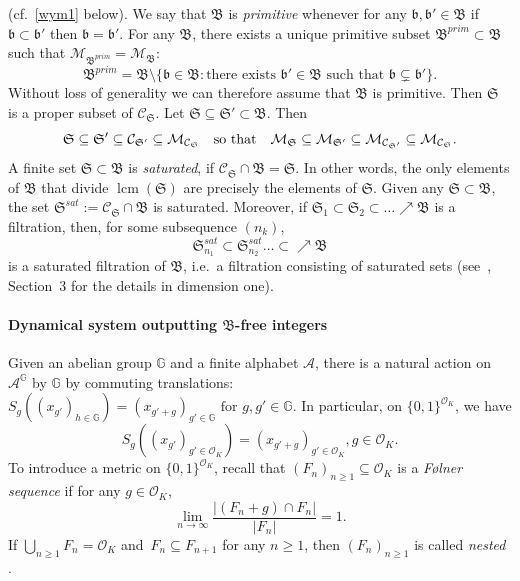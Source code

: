 \documentclass[leqno,a4paper,12pt]{article}
\DeclareMathOperator{\lcm}{lcm}
\theoremstyle{definition}
\newcommand{\cM}{{\cal M}}
\newcommand{\OK}{\mathcal{O}_K}
\newcommand{\cC}{\mathcal{C}}
\begin{document}
(cf.~\eqref{wym1} below).
We say that $\mathfrak{B}$ is \emph{primitive} whenever for any $\mathfrak{b},\mathfrak{b}'\in\mathfrak{B}$ if $\mathfrak{b}\subset\mathfrak{b}'$ then $\mathfrak{b}=\mathfrak{b}'$. For any $\mathfrak{B}$, there exists a unique primitive subset $\mathfrak{B}^{prim}\subset\mathfrak{B}$ such that $\mathcal{M}_{\mathfrak{B}^{prim}}=\mathcal{M}_{\mathfrak{B}}$:
\[
\mathfrak{B}^{prim}=\mathfrak{B}\setminus\{\mathfrak{b}\in\mathfrak{B} : \text{there exists }\mathfrak{b}'\in\mathfrak{B}\text{ such that }\mathfrak{b}\subsetneq\mathfrak{b}'\}.
\]
Without loss of generality we can therefore assume that $\mathfrak{B}$ is primitive. Then $\mathfrak{S}$ is a proper subset of $\cC_\mathfrak{S}$.
Let $\mathfrak{S}\subseteq \mathfrak{S}' \subset\mathfrak{B}$. Then
\begin{equation*}\label{eq:A_S-inclusions}
\mathfrak{S}\subseteq\mathfrak{S}'\subseteq\cC_{\mathfrak{S}'}\subseteq\cM_{\cC_\mathfrak{S}}\text{\quad so that\quad}
\cM_\mathfrak{S}\subseteq\cM_{\mathfrak{S}'}\subseteq\cM_{\cC_{\mathfrak{S}'}}\subseteq\cM_{\cC_\mathfrak{S}}.
\end{equation*}
A finite set $\mathfrak{S}\subset\mathfrak{B}$ is \emph{saturated}, if $\cC_\mathfrak{S}\cap\mathfrak{B}=\mathfrak{S}$. In other words, the only elements of $\mathfrak{B}$ that divide $\lcm(\mathfrak{S})$ are precisely the elements of $\mathfrak{S}$.
 Given any $\mathfrak{S}\subset \mathfrak{B}$, the set $\mathfrak{S}^{sat}:=\cC_\mathfrak{S}\cap\mathfrak{B}$ is saturated. Moreover, if $\mathfrak{S}_1\subset \mathfrak{S}_2\subset\dots \nearrow \mathfrak{B}$ is a filtration, then, for some subsequence $(n_k)$,
\[
\mathfrak{S}_{n_1}^{sat}\subset \mathfrak{S}_{n_2}^{sat} \dots\subset\nearrow \mathfrak{B}
\]
is a saturated filtration of $\mathfrak{B}$, i.e.\ a filtration consisting of saturated sets (see~\cite{DKK}, Section~3 for the details in dimension one).

\paragraph{Dynamical system outputting $\mathfrak{B}$-free integers}\label{szift}
Given an abelian group $\mathbb{G}$ and a finite alphabet $\mathcal{A}$, there is a natural action on $\mathcal{A}^\mathbb{G}$ by $\mathbb{G}$ by commuting translations: $S_g({(x_{g'})}_{h\in \mathbb{G}})={(x_{g'+g})}_{g'\in \mathbb{G}}\text{ for }g,g'\in \mathbb{G}.$
In particular, on $\{0,1\}^{\OK}$, we have
\begin{equation*}\label{eq:translations}
S_g({(x_{g'})}_{g'\in \mathcal{O}_K})={(x_{g'+g})}_{g'\in \mathcal{O}_K}, g\in\OK.
\end{equation*}
To introduce a metric on $\{0,1\}^{\OK}$, recall that $(F_n)_{n\geq 1}\subseteq \OK$ is a \emph{F\o lner sequence} if for any $g\in \OK$,
\[
\lim_{n\to \infty}\frac{|(F_n+g)\cap F_n|}{|F_n|}=1.
\]
If $\bigcup\limits_{n\geq 1}F_n=\OK$ and~$F_n\subseteq F_{n+1}$ for any $n\geq 1$, then $(F_n)_{n\geq 1}$ is called \emph{nested} \cite{MR64062, MR79220}.
\end{document}

